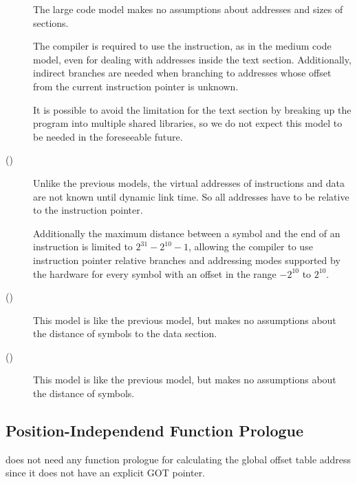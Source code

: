 \begin{description}
\item[]
  
  The large code model makes no assumptions about addresses and sizes
  of sections.
  
  The compiler is required to use the  instruction, as in
  the medium code model, even for dealing with addresses inside the
  text section.  Additionally, indirect branches are needed when
  branching to addresses whose offset from the current instruction
  pointer is unknown.
  
  It is possible to avoid the limitation for the text section by
  breaking up the program into multiple shared libraries, so we do not
  expect this model to be needed in the foreseeable future.

\item[ ()]
  
  Unlike the previous models, the virtual addresses of instructions
  and data are not known until dynamic link time.  So all addresses
  have to be relative to the instruction pointer.
  
  Additionally the maximum distance between a symbol and the end of an
  instruction is limited to $2^{31}-2^{10}-1$, allowing the compiler
  to use instruction pointer relative branches and addressing modes
  supported by the hardware for every symbol with an offset in the
  range $-2^{10}$ to $2^{10}$.

\item[
  ()]
  
  This model is like the previous model, but makes no assumptions
  about the distance of symbols to the data section.
  
\item[
  ()]
  
  This model is like the previous model, but makes no assumptions
  about the distance of symbols.

\end{description}

\subsection{Position-Independend Function Prologue}

\xARCH does not need any function prologue for calculating the global
offset table address since it does not have an explicit GOT pointer.

